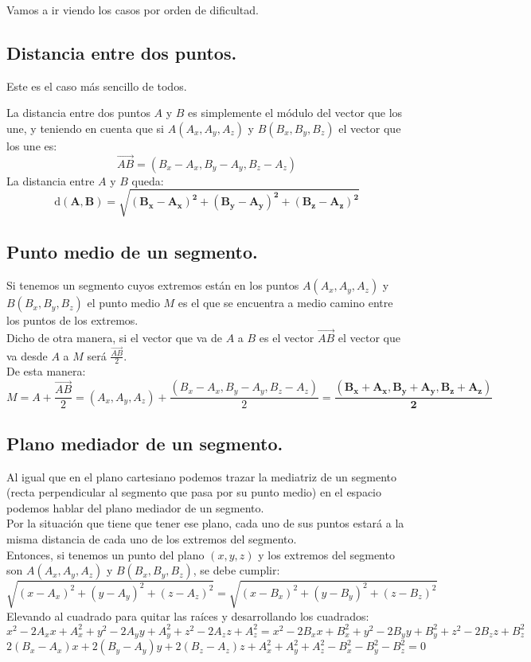 \documentclass[a4paper,11pt,answers]{exam}
\newcommand\distancia[1]{\mathrm{d}(#1)}
\begin{document}
Vamos a ir viendo los casos por orden de dificultad.

\subsection{Distancia entre dos puntos.}
Este es el caso más sencillo de todos.

La distancia entre dos puntos $A$ y $B$ es simplemente el módulo del vector que los une, y teniendo en cuenta que si $A(A_x, A_y, A_z)$ y $B(B_x,B_y, B_z)$ el vector que los une es:
\[\overrightarrow{AB} = (B_x-A_x, B_y-A_y, B_z-A_z)\]
La distancia entre $A$ y $B$ queda:
\[\boldsymbol{\distancia{A,B} = \sqrt{(B_x-A_x)^2 + (B_y-A_y)^2 + (B_z-A_z)^2}}\]

\subsection{Punto medio de un segmento.}
Si tenemos un segmento cuyos extremos están en los puntos $A(A_x, A_y, A_z)$ y $B(B_x,B_y, B_z)$ el punto medio $M$ es el que se encuentra a medio camino entre los puntos de los extremos.\\
Dicho de otra manera, si el vector que va de $A$ a $B$ es el vector $\overrightarrow{AB}$ el vector que va desde $A$ a $M$ será $\frac{\overrightarrow{AB}}{2}$.\\
De esta manera:
\[M = A + \frac{\overrightarrow{AB}}{2} = (A_x, A_y, A_z) +
 \frac{(B_x-A_x, B_y-A_y, B_z-A_z)}{2} =
 \boldsymbol{\frac{(B_x+A_x, B_y+A_y, B_z+A_z)}{2}}\]
 
\subsection{Plano mediador de un segmento.}
Al igual que en el plano cartesiano podemos trazar la mediatriz de un segmento (recta perpendicular al segmento que pasa por su punto medio) en el espacio podemos hablar del plano mediador de un segmento.\\
Por la situación que tiene que tener ese plano, cada uno de sus puntos estará a la misma distancia de cada uno de los extremos del segmento.\\

Entonces, si tenemos un punto del plano $(x, y, z)$ y los extremos del segmento son $A(A_x, A_y, A_z)$ y $B(B_x,B_y, B_z)$, se debe cumplir:
\[\sqrt{(x-A_x)^2 + (y-A_y)^2 + (z-A_z)^2} =
\sqrt{(x-B_x)^2 + (y-B_y)^2 + (z-B_z)^2}\]
Elevando al cuadrado para quitar las raíces y desarrollando los cuadrados:
\[x^2 - 2A_x x +A_x^2 + y^2 - 2A_y y + A_y^2 + z^2 - 2A_z z + A_z^2 =
x^2 - 2B_x x +B_x^2 + y^2 - 2B_y y + B_y^2 + z^2 - 2B_z z + B_z^2\]
\[2(B_x - A_x)x + 2(B_y - A_y) y + 2(B_z - A_z) z + A_x^2 + A_y^2 + A_z^2
-B_x^2 - B_y^2 - B_z^2 =0\]
\end{document}
